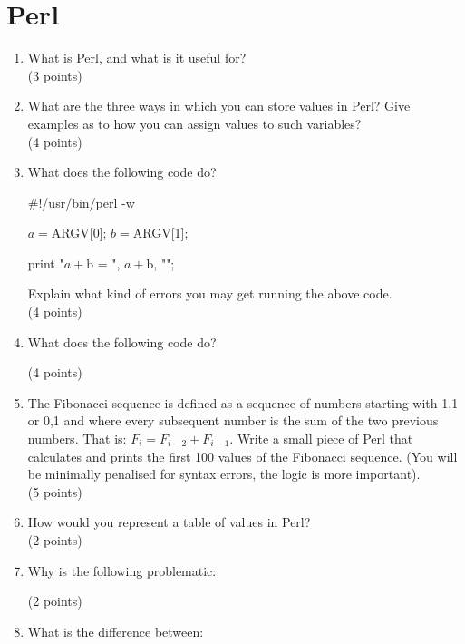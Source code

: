 \documentclass[11pt]{article}
\begin{document}
\section{Perl}
\begin{enumerate}
\item What is Perl, and what is it useful for?\\
  (3 points)
\item What are the three ways in which you can store values in Perl? Give
  examples as to how you can assign values to such variables?\\
  (4 points)
\item What does the following code do?

  \begin{perlcode}
  #!/usr/bin/perl -w
    
  $a = $ARGV[0];
  $b = $ARGV[1];

  print "$a + $b = ", $a + $b, "\n";
    
  \end{perlcode}
  Explain what kind of errors you may get running the above code.\\
  (4 points)
\item What does the following code do?

(4 points)
\item The Fibonacci sequence is defined as a sequence of numbers starting
  with 1,1 or 0,1 and where every subsequent number is the sum of the two
  previous numbers. That is: $F_i = F_{i-2} + F_{i-1}$. Write a small piece
  of Perl that calculates and prints the first 100 values of the Fibonacci
  sequence. (You will be minimally penalised for syntax errors, the logic is
  more important).\\
  (5 points)
\item How would you represent a table of values in Perl?\\
  (2 points)
\item Why is the following problematic:

  (2 points)
\item What is the difference between:


\end{enumerate}
\end{document}
